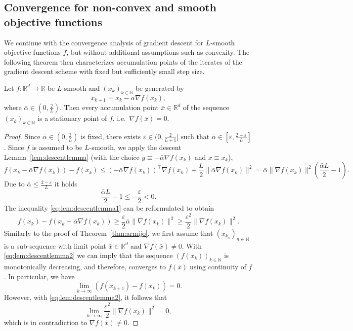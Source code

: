 \documentclass[12pt,openany]{book}
\theoremstyle{definition}
\theoremstyle{definition}
\newcommand{\N}{\mathbb{N}}
\newcommand{\R}{\mathbb{R}}
\begin{document}
\subsection{Convergence for non-convex and smooth objective functions}\label{ssec:nonconvexsmooth}
We continue with the convergence analysis of gradient descent for $L$-smooth objective functions $f$, but without additional assumptions such as convexity. The following theorem then characterizes accumulation points of the iterates of the gradient descent scheme with fixed but sufficiently small step size. 

\begin{thm}\label{thm:GD_conststep}
Let $f:\R^d\to\R$ be $L$-smooth and $(x_k)_{k\in\N}$ be generated by
\[x_{k+1} = x_k - \bar\alpha \nabla f(x_k),\]
where $\bar\alpha\in(0,\frac{2}{L})$. Then every accumulation point $\bar x\in\R^d$ of the sequence $(x_k)_{k\in\N}$ is a stationary point of $f$, i.e.~$\nabla f(\bar x)=0$.
\end{thm}

\begin{proof}
Since $\bar\alpha\in(0,\frac2L)$ is fixed, there exists $\varepsilon\in(0,\frac{2}{L+1}]$ such that $\bar\alpha\in[\varepsilon,\frac{2-\varepsilon}{L}]$. 
Since $f$ is assumed to be $L$-smooth, we apply the descent Lemma~\ref{lem:descentlemma} (with the choice $y\equiv -\bar\alpha\nabla f(x_k)$ and $x\equiv x_k$),
\begin{equation}\label{eq:lem:descentlemma1}
f(x_k-\bar\alpha\nabla f(x_k))-f(x_k) \le (-\bar\alpha\nabla f(x_k))^\top \nabla f(x_k) + \frac{L}2\|\bar\alpha \nabla f(x_k)\|^2 = \bar\alpha \|\nabla f(x_k)\|^2 (\frac{\bar\alpha L}{2}-1).
\end{equation} 
Due to $\bar\alpha\le \frac{2-\varepsilon}{L}$ it holds
\[ \frac{\bar\alpha L}{2}-1 \le -\frac{\varepsilon}2<0.\]
The inequality \eqref{eq:lem:descentlemma1} can be reformulated to obtain
\begin{equation}\label{eq:lem:descentlemma2}
f(x_k) - f(x_k-\bar\alpha\nabla f(x_k)) \ge \frac{\varepsilon}2 \bar\alpha \|\nabla f(x_k)\|^2 \ge \frac{\varepsilon^2}2 \|\nabla f(x_k)\|^2. 
\end{equation}
Similarly to the proof of Theorem~\ref{thm:armijo}, we first assume that $(x_{k_n})_{n\in\N}$ is a sub-sequence with limit point $\bar x\in\R^d$ and $\nabla f(\bar x)\neq 0$. With \eqref{eq:lem:descentlemma2} we can imply that the sequence $(f(x_k))_{k\in\N}$ is monotonically decreasing, and therefore, converges to $f(\bar x)$ using continuity of $f$. In particular, we have
\[\lim_{k\to\infty} (f(x_{k+1})-f(x_k)) = 0. \]
However, with \eqref{eq:lem:descentlemma2}, it follows that
\[\lim_{k\to\infty} \frac{\varepsilon^2}{2}\|\nabla f(x_k)\|^2 = 0, \]
which is in contradiction to $\nabla f(\bar x) \neq 0$.
\end{proof}
\end{document}
